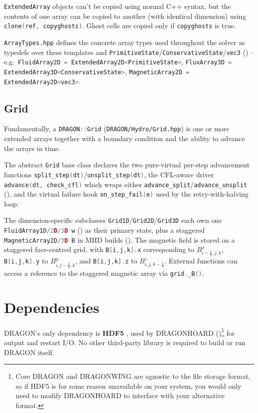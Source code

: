 \documentclass[11pt]{report}
\newcommand{\cpp}[1]{\lstinline[language=C++]{#1}}
\newcommand{\bash}[1]{\lstinline[language=bash]{#1}}
\begin{document}
\cpp{ExtendedArray} objects can't be copied using normal C++ syntax, but the contents of one array can be copied to another (with identical dimension) using  \cpp{clone(ref, copyghosts)}. Ghost cells are copied only if \cpp{copyghosts} is true.

\bash{ArrayTypes.hpp} defines the concrete array types used throughout the solver as typedefs over these templates and \cpp{PrimitiveState}/\cpp{ConservativeState}/\cpp{vec3} () -- e.g.\ \cpp{FluidArray2D = ExtendedArray2D<PrimitiveState>}, \cpp{FluxArray3D = ExtendedArray3D<ConservativeState>}, \cpp{MagneticArray2D = ExtendedArray2D<vec3>}. 


\subsection{Grid}
\label{sec:grid}

Fundamentally, a \cpp{DRAGON::Grid} (\bash{DRAGON/Hydro/Grid.hpp}) is one or more extended arrays together with a boundary condition and the ability to advance the arrays in time. 

The abstract \cpp{Grid} base class declares the two pure-virtual per-step advancement functions \cpp{split_step(dt)}/\cpp{unsplit_step(dt)}, the CFL-aware driver \cpp{advance(dt, check_cfl)} which wraps either \cpp{advance_split}/\cpp{advance_unsplit} (), and the virtual failure hook \cpp{on_step_fail(e)} used by the retry-with-halving loop.

The dimension-specific subclasses \cpp{Grid1D}/\cpp{Grid2D}/\cpp{Grid3D} each own one \cpp{FluidArray1D/2D/3D w} () as their primary state, plus a staggered \cpp{MagneticArray2D/3D B} in MHD builds ().
The magnetic field is stored on a staggered face-centred grid, with \cpp{B[i,j,k].x} corresponding to $B_{i-\frac12,j,k}^x$, \cpp{B[i,j,k].y}  to $B_{i,j-\frac12,k}^y$, and \cpp{B[i,j,k].z}  to $B_{i,j,k-\frac12}^z$.
 External functions can access a reference to the staggered magnetic array via \cpp{grid._B()}.


\section{Dependencies}
\label{sec:dependencies}

DRAGON's only dependency is \textbf{HDF5} \citep{HDFGroup}, used by DRAGONHOARD ()\footnote{Core DRAGON and DRAGONWING are agnostic to the file storage format, so if HDF5 is for some reason unavailable on your system, you would only need to modify DRAGONHOARD to interface with your alternative format.} for output and restart I/O.
No other third-party library is required to build or run DRAGON itself.
\end{document}
